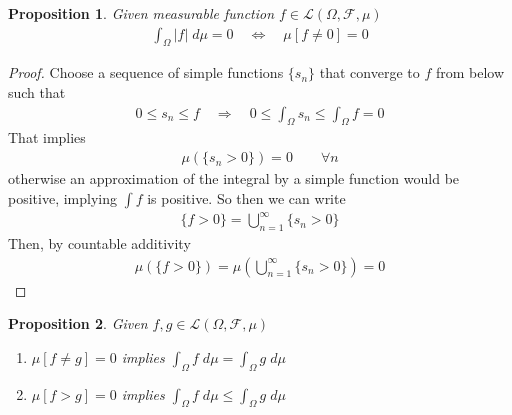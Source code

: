 \documentclass[12pt]{article}
\theoremstyle{plain}
\newtheorem{thm}{Theorem}[section]
\newtheorem{prop}[thm]{Proposition}
\theoremstyle{definition}
\theoremstyle{remark}
\newcommand{\sF}{\mathscr{F}}
\begin{document}
\begin{prop}
Given measurable function $f\in\mathscr{L}(\Omega,\sF,\mu)$
\begin{align*}
  \int_\Omega |f| \; d\mu = 0
  \quad\iff\quad
  \mu[f\neq 0] = 0
\end{align*}
\end{prop}
\begin{proof}
Choose a sequence of simple functions $\{s_n\}$ that converge to $f$
from below such that
\begin{align*}
  0 \leq s_n \leq f
  \quad\Rightarrow\quad
  0 \leq \int_\Omega s_n \leq \int_\Omega f = 0
\end{align*}
That implies
\begin{align*}
  \mu\left(\{s_n > 0 \}\right) = 0
  \qquad \forall n
\end{align*}
otherwise an approximation of the integral by a simple function would be
positive, implying $\int f$ is positive. So then we can write
\begin{align*}
  \{f>0\} =
  \bigcup^\infty_{n=1} \{s_n>0\}
\end{align*}
Then, by countable additivity
\begin{align*}
    \mu\left(\{f>0 \} \right)=
    \mu\left(\bigcup^\infty_{n=1} \{ s_n>0 \}
    \right) = 0
\end{align*}
\end{proof}


\begin{prop}
Given $f,g\in\mathscr{L}(\Omega,\mathscr{F},\mu)$
\begin{enumerate}
  \item $\mu[f\neq g] = 0$
    implies
    $\int_\Omega f \; d\mu = \int_\Omega g \; d\mu$
  \item $\mu[f > g] = 0$ implies
    $\int_\Omega f \; d\mu \leq \int_\Omega g \; d\mu$
\end{enumerate}
\end{prop}
\end{document}
